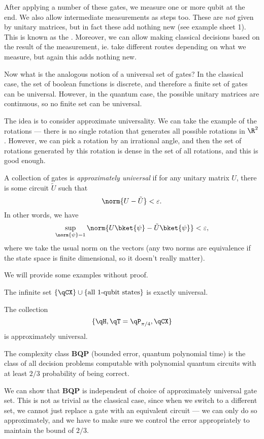\documentclass[a4paper]{article}
\begin{document}
After applying a number of these gates, we measure one or more qubit at the end. We also allow intermediate measurements as steps too. These are \emph{not} given by unitary matrices, but in fact these add nothing new (see example sheet 1). This is known as the . Moreover, we can allow making classical decisions based on the result of the measurement, ie. take different routes depending on what we measure, but again this adds nothing new.

Now what is the analogous notion of a universal set of gates? In the classical case, the set of boolean functions is discrete, and therefore a finite set of gates can be universal. However, in the quantum case, the possible unitary matrices are continuous, so no finite set can be universal.

The idea is to consider approximate universality. We can take the example of the rotations --- there is no single rotation that generates all possible rotations in $\R^2$. However, we can pick a rotation by an irrational angle, and then the set of rotations generated by this rotation is dense in the set of all rotations, and this is good enough.

\begin{defi}
  A collection of gates is \emph{approximately universal} if for any unitary matrix $U$, there is some circuit $\tilde{U}$ such that
  \[
    \norm{U - \tilde{U}} < \varepsilon.
  \]
  In other words, we have
  \[
    \sup_{\norm{\psi} = 1} \norm{U\bket{\psi} - \tilde{U} \bket{\psi}} < \varepsilon,
  \]
  where we take the usual norm on the vectors (any two norms are equivalence if the state space is finite dimensional, so it doesn't really matter).
\end{defi}

We will provide some examples without proof.
\begin{eg}
  The infinite set $\{\qCX\} \cup \{\text{all $1$-qubit states}\}$ is exactly universal.
\end{eg}

\begin{eg}
  The collection
  \[
    \{\qH, \qT = \qP_{\pi/4}, \qCX\}
  \]
  is approximately universal.
\end{eg}

\begin{defi}
  The complexity class \textbf{BQP} (bounded error, quantum polynomial time) is the class of all decision problems computable with polynomial quantum circuits with at least $2/3$ probability of being correct.
\end{defi}
We can show that \textbf{BQP} is independent of choice of approximately universal gate set. This is not as trivial as the classical case, since when we switch to a different set, we cannot just replace a gate with an equivalent circuit --- we can only do so approximately, and we have to make sure we control the error appropriately to maintain the bound of $2/3$.
\end{document}

